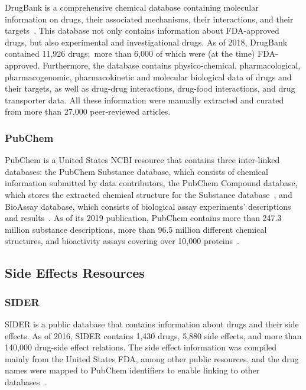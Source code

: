 DrugBank is a comprehensive chemical database containing molecular information on drugs, their associated mechanisms, their interactions, and their targets~\cite{wishart_drugbank_2018}.
This database not only contains information about \ac{FDA}-approved drugs, but also experimental and investigational drugs.
As of 2018, DrugBank contained 11,926 drugs;~more than 6,000 of which were (at the time) \ac{FDA}-approved.
Furthermore, the database contains physico-chemical, pharmacological, pharmacogenomic, pharmacokinetic and molecular biological data of drugs and their targets, as well as drug-drug interactions, drug-food interactions, and drug transporter data.
All these information were manually extracted and curated from more than 27,000 peer-reviewed articles.

\subsubsection{PubChem}

PubChem is a United States \ac{NCBI} resource that contains three inter-linked databases: the PubChem Substance database, which consists of chemical information submitted by data contributors, the PubChem Compound database, which stores the extracted chemical structure for the Substance database~\cite{kim_pubchem_2016}, and BioAssay database, which consists of biological assay experiments’ descriptions and results~\cite{kim_pubchem_2019}.
As of its 2019 publication, PubChem contains more than 247.3 million substance descriptions, more than 96.5 million different chemical structures, and bioactivity assays covering over 10,000 proteins~\cite{kim_pubchem_2019}.

\subsection{Side Effects Resources}

\subsubsection{SIDER}

\ac{SIDER} is a public database that contains information about drugs and their side effects.
As of 2016, \ac{SIDER} contains 1,430 drugs, 5,880 side effects, and more than 140,000 drug-side effect relations.
The side effect information was compiled mainly from the United States \ac{FDA}, among other public resources, and the drug names were mapped to PubChem identifiers to enable linking to other databases~\cite{kuhn_sider_2016}.

